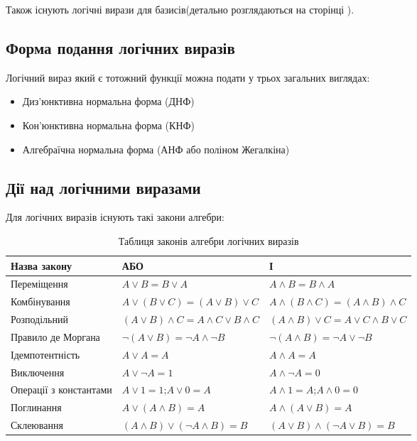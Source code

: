 Також існують логічні вирази для базисів(детально розглядаються на сторінці  \pageref{subsect:logic_basis}).
\newpage
\subsection{Форма подання логічних виразів}
Логічний вираз який є тотожний функції можна подати у трьох загальних виглядах:
\begin{itemize}
	\item Диз'юнктивна нормальна форма (ДНФ)
	\item Кон'юнктивна нормальна форма (КНФ)
	\item Алгебраїчна нормальна форма (АНФ або поліном Жегалкіна)
\end{itemize}
\newpage
\subsection{Дії над логічними виразами}
Для логічних виразів існують такі закони алгебри:
\begin{center}
\begin{table}[h!]
\begin{tabu} { | X[3,с] | X[3,c] | X[3,c] | }
 \hline
Назва закону& АБО & І \\
 \hline
 Переміщення &$A \lor B = B \lor A$  &$A \wedge B = B \wedge A $  \\
\hline
 Комбінування &$A \lor (B \lor C)= (A \lor B) \lor C $  &$A \wedge (B \wedge C)= (A \wedge B) \wedge C $  \\
\hline
Розподільний &$(A \lor B) \wedge C= A \wedge C \lor B \wedge C $  \vspace{1mm}&$(A \wedge B) \lor C= A \lor C \wedge B \lor C $ \vspace{1mm}   \\
\hline
Правило де Моргана & $\neg(A \lor B) = \neg A \wedge \neg B$& $\neg(A \wedge B) = \neg A \lor \neg B$\\
\hline
Ідемпотентність & $A \lor A = A$ &$A \wedge A = A $   \\
\hline
Виключення &$A \lor \neg A = 1$ & $A \wedge \neg A = 0$  \\
\hline
Операції з константами & $A \lor 1= 1$;$A \lor 0 = A$&$A \wedge 1 = A$;$A \wedge 0 = 0$  \\
\hline
Поглинання &$A \lor (A \wedge B) = A $ &$A \wedge (A \lor B) = A $   \\
\hline
Склеювання&$(A \wedge B) \lor (\neg A \wedge B)=B$&$(A \lor B) \wedge (\neg A \lor B)=B$   \\
\hline
\end{tabu}
\vspace{6mm}\\
\caption{Таблиця законів алгебри логічних виразів}\label{tab:logic_formulas}
\end{table}
\end{center}

